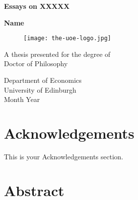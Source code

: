 \documentclass[12pt]{report}
\begin{document}
	
	
	
	
	\begin{titlepage}
		
		\begin{center}
			\vspace*{1cm}
			
			\textbf{\Large Essays on XXXXX}
			
			\vspace{0.5cm}
			
			
			\vspace{1.5cm}
			
			\textbf{\large Name }
			
			\vspace{4cm}		
			\begin{figure}[H]
				\centering
					\texttt{[image: the-uoe-logo.jpg]}
			\end{figure}	
			\vfill
			
			
			A thesis presented for the degree of\\
			Doctor of Philosophy
			
			\vspace{0.8cm}
			
			
			Department of Economics\\
			University of Edinburgh\\
			Month Year
			
		\end{center}
	\end{titlepage}

\newpage
\chapter*{Acknowledgements}

This is your Acknowledgements section.


\newpage
\chapter*{Abstract}
%
\end{document}

